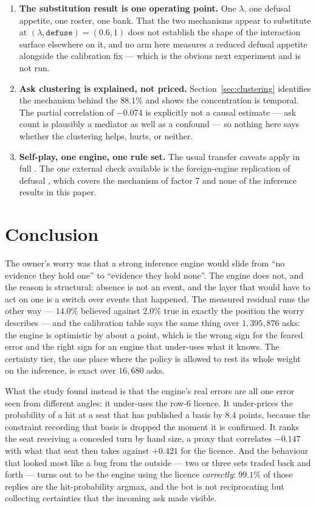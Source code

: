 \documentclass[11pt]{article}
\newcommand{\code}[1]{\texttt{#1}}
\begin{document}
\begin{enumerate}
\item \textbf{The substitution result is one operating point.} One $\lambda$, one defusal
  appetite, one roster, one bank. That the two mechanisms appear to substitute at
  $(\lambda, \code{defuse}) = (0.6, 1)$ does not establish the shape of the interaction
  surface elsewhere on it, and no arm here measures a reduced defusal appetite alongside
  the calibration fix --- which is the obvious next experiment and is not run.

\item \textbf{Ask clustering is explained, not priced.} Section~\ref{sec:clustering}
  identifies the mechanism behind the $88.1\%$ and shows the concentration is temporal.
  The partial correlation of $-0.074$ is explicitly not a causal estimate --- ask count is
  plausibly a mediator as well as a confound --- so nothing here says whether the
  clustering helps, hurts, or neither.

\item \textbf{Self-play, one engine, one rule set.} The usual transfer caveats apply in
  full \cite{v05paper,v10paper}. The one external check available is the foreign-engine
  replication of defusal \cite{crossplay}, which covers the mechanism of factor 7 and none
  of the inference results in this paper.
\end{enumerate}

\section{Conclusion}
\label{sec:conclusion}

The owner's worry was that a strong inference engine would slide from ``no evidence they
hold one'' to ``evidence they hold none''. The engine does not, and the reason is
structural: absence is not an event, and the layer that would have to act on one is a
switch over events that happened. The measured residual runs the other way --- $14.0\%$
believed against $2.0\%$ true in exactly the position the worry describes --- and the
calibration table says the same thing over $1{,}395{,}876$ asks: the engine is optimistic
by about a point, which is the wrong sign for the feared error and the right sign for an
engine that under-uses what it knows. The certainty tier, the one place where the policy
is allowed to rest its whole weight on the inference, is exact over $16{,}680$ asks.

What the study found instead is that the engine's real errors are all one error seen from
different angles: it under-uses the row-6 licence. It under-prices the probability of a
hit at a seat that has published a basis by $8.4$ points, because the constraint recording
that basis is dropped the moment it is confirmed. It ranks the seat receiving a conceded
turn by hand size, a proxy that correlates $-0.147$ with what that seat then takes against
$+0.421$ for the licence. And the behaviour that looked most like a bug from the
outside --- two or three sets traded back and forth --- turns out to be the engine using
the licence \emph{correctly}: $99.1\%$ of those replies are the hit-probability argmax, and
the bot is not reciprocating but collecting certainties that the incoming ask made
visible.
\end{document}
